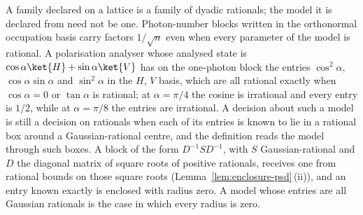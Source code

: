 
A family declared on a lattice is a family of dyadic rationals; the model it
is declared from need not be one. Photon-number blocks written in the
orthonormal occupation basis carry factors $1/\sqrt{n}$ even when every
parameter of the model is rational. A polarisation analyser whose analysed
state is $\cos\alpha\ket{H}+\sin\alpha\ket{V}$ has on the one-photon block
the entries $\cos^2\alpha$, $\cos\alpha\sin\alpha$ and $\sin^2\alpha$ in the
$H$, $V$ basis, which are all rational exactly when $\cos\alpha=0$ or
$\tan\alpha$ is rational; at $\alpha=\pi/4$ the cosine is irrational and
every entry is $1/2$, while at $\alpha=\pi/8$ the entries are irrational. A decision
about such a model is still a decision on rationals when each of its entries
is known to lie in a rational box around a Gaussian-rational centre, and the
definition reads the model through such boxes. A block of the form
$D^{-1}SD^{-1}$, with $S$ Gaussian-rational and $D$ the diagonal matrix of
square roots of positive rationals, receives one from rational bounds on
those square roots (Lemma~\ref{lem:enclosure-psd}\,(ii)), and an entry known
exactly is enclosed with radius zero. A model whose entries are all Gaussian
rationals is the case in which every radius is zero.

